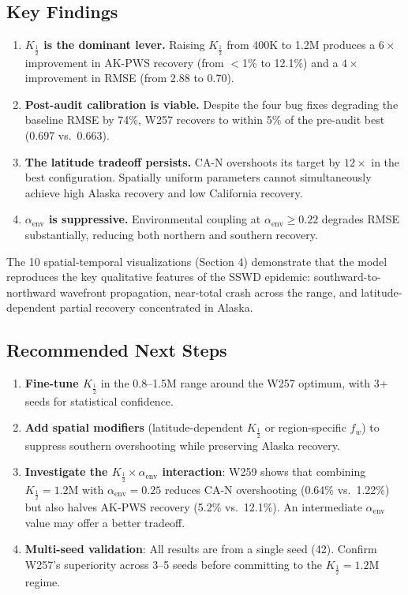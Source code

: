 \documentclass[11pt,a4paper,oneside]{article}
\begin{document}
\subsection{Key Findings}

\begin{enumerate}[nosep]
    \item \textbf{$K_{\frac{1}{2}}$ is the dominant lever.} Raising $K_{\frac{1}{2}}$ from 400K to 1.2M produces a $6\times$ improvement in AK-PWS recovery (from $<$1\% to 12.1\%) and a $4\times$ improvement in RMSE (from 2.88 to 0.70).
    \item \textbf{Post-audit calibration is viable.} Despite the four bug fixes degrading the baseline RMSE by 74\%, W257 recovers to within 5\% of the pre-audit best (0.697 vs.\ 0.663).
    \item \textbf{The latitude tradeoff persists.} CA-N overshoots its target by $12\times$ in the best configuration. Spatially uniform parameters cannot simultaneously achieve high Alaska recovery and low California recovery.
    \item \textbf{$\alpha_{\text{env}}$ is suppressive.} Environmental coupling at $\alpha_{\text{env}} \geq 0.22$ degrades RMSE substantially, reducing both northern and southern recovery.
\end{enumerate}

The 10 spatial-temporal visualizations (Section 4) demonstrate that the model reproduces the key qualitative features of the SSWD epidemic: southward-to-northward wavefront propagation, near-total crash across the range, and latitude-dependent partial recovery concentrated in Alaska.

\subsection{Recommended Next Steps}

\begin{enumerate}[nosep]
    \item \textbf{Fine-tune $K_{\frac{1}{2}}$} in the 0.8--1.5M range around the W257 optimum, with 3+ seeds for statistical confidence.
    \item \textbf{Add spatial modifiers} (latitude-dependent $K_{\frac{1}{2}}$ or region-specific $f_w$) to suppress southern overshooting while preserving Alaska recovery.
    \item \textbf{Investigate the $K_{\frac{1}{2}} \times \alpha_{\text{env}}$ interaction}: W259 shows that combining $K_{\frac{1}{2}} = 1.2\text{M}$ with $\alpha_{\text{env}} = 0.25$ reduces CA-N overshooting (0.64\% vs.\ 1.22\%) but also halves AK-PWS recovery (5.2\% vs.\ 12.1\%). An intermediate $\alpha_{\text{env}}$ value may offer a better tradeoff.
    \item \textbf{Multi-seed validation}: All results are from a single seed (42). Confirm W257's superiority across 3--5 seeds before committing to the $K_{\frac{1}{2}} = 1.2\text{M}$ regime.
\end{enumerate}
\end{document}
